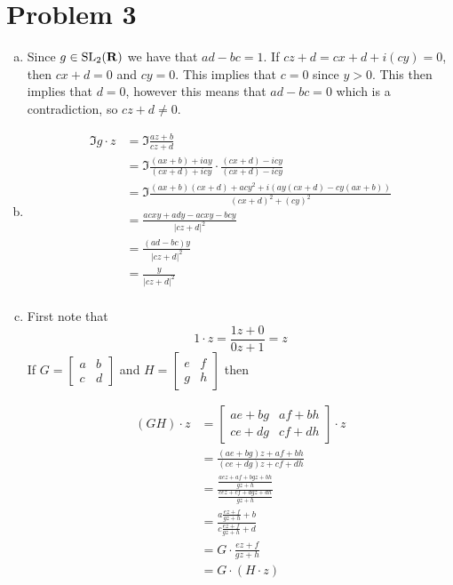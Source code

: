 \documentclass{article}
\begin{document}
\section*{Problem 3}
\begin{enumerate}[(a)]
	\item Since $g \in \text{SL}_2(\bf{R})$ we have that 
	$ad-bc = 1$.
	If $cz+d = cx+d + i(cy) = 0$, then $cx+d = 0$ and $cy = 0$.
	This implies that $c = 0$ since $y > 0$. This then implies that $d = 0$, however
	this means that $ad-bc = 0$ which is a contradiction,
	so $cz+d \neq 0$.
	\item 
	\begin{align*}
		\Im g \cdot z &= \Im\frac{az+b}{cz+d}\\
		&= \Im \frac{(ax+b) + iay}{(cx+d) + icy} \cdot \frac{(cx+d) - icy}{(cx+d) - icy} \\
		&= \Im \frac{(ax+b)(cx+d) + acy^2 + i(ay(cx+d) - cy(ax+b))}{(cx+d)^2 + (cy)^2} \\
		&= \frac{acxy + ady - acxy - bcy}{|cz+d|^2} \\
		&= \frac{(ad-bc)y }{|cz+d|^2} \\
		&= \frac{y }{|cz+d|^2} \\
	\end{align*}
	\item First note that 
	\[	
		1 \cdot z = \frac{1z + 0}{0z + 1} = z
	\]
	If $G = \begin{bmatrix}
		a & b \\
		c & d
	\end{bmatrix}$ and 
	$H = \begin{bmatrix}
		e & f \\
		g & h
	\end{bmatrix}$
	then

	\begin{align*}
		(GH) \cdot z &=  
		\begin{bmatrix}
			ae+bg & af+bh \\
			ce+dg & cf+dh
		\end{bmatrix} \cdot z \\
		&= \frac{(ae+bg)z + af+bh}{(ce+dg)z + cf+dh} \\
		&= \frac{\frac{aez + af + bgz +bh}{gz + h}}{\frac{cez + cf+dgz + dh}{gz + h}} \\
		&= \frac{a\frac{ez + f}{gz + h} + b}{c\frac{ez + f}{gz + h} + d} \\
		&= G \cdot \frac{ez + f}{gz + h}\\
		&= G \cdot (H \cdot z)
	\end{align*}
\end{enumerate}
\newpage
\end{document}
